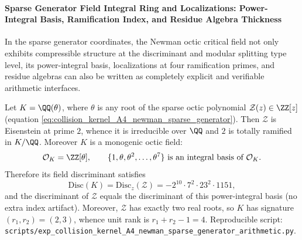 %
\paragraph{Sparse Generator Field Integral Ring and Localizations: Power-Integral Basis, Ramification Index, and Residue Algebra Thickness}
In the sparse generator coordinates, the Newman octic critical field not only exhibits compressible structure at the discriminant and modular splitting type level,
its power-integral basis, localizations at four ramification primes, and residue algebras can also be written as completely explicit and verifiable arithmetic interfaces.

\begin{conclusion}\label{con:pom-a4-newman-integral-basis-2eisenstein}
Let \(K=\QQ(\theta)\), where \(\theta\) is any root of the sparse octic polynomial \(\mathcal Z(z)\in\ZZ[z]\) (equation \eqref{eq:collision_kernel_A4_newman_sparse_generator}).
Then \(\mathcal Z\) is Eisenstein at prime \(2\), whence it is irreducible over \(\QQ\) and \(2\) is totally ramified in \(K/\QQ\).
Moreover \(K\) is a monogenic octic field:
\[
\mathcal O_K=\ZZ[\theta],
\qquad
\{1,\theta,\theta^2,\dots,\theta^7\}\ \text{is an integral basis of}\ \mathcal O_K.
\]
Therefore its field discriminant satisfies
\[
\mathrm{Disc}(K)=\mathrm{Disc}_z(\mathcal Z)=-2^{10}\cdot 7^{2}\cdot 23^{2}\cdot 1151,
\]
and the discriminant of \(\mathcal Z\) equals the discriminant of this power-integral basis (no extra index artifact).
Moreover, \(\mathcal Z\) has exactly two real roots, so \(K\) has signature \((r_1,r_2)=(2,3)\), whence unit rank is \(r_1+r_2-1=4\).
Reproducible script: \texttt{scripts/exp\_collision\_kernel\_A4\_newman\_sparse\_generator\_arithmetic.py}.
\end{conclusion}



